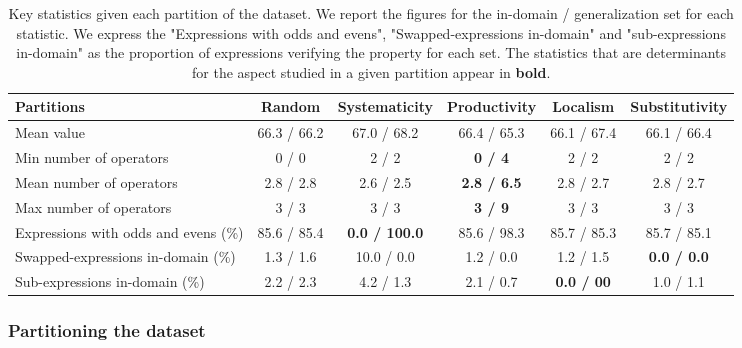 \begin{table}[t]
    \footnotesize
    \begin{tabularx}{16cm}{X|ccccc}
    \toprule
    \textbf{Partitions} & \textbf{Random} & \textbf{Systematicity} & \textbf{Productivity} & \textbf{Localism} & \textbf{Substitutivity} \\
    \midrule
    Mean value & 66.3 / 66.2 & 67.0 / 68.2 & 66.4 / 65.3 & 66.1 / 67.4 & 66.1 / 66.4 \\
    Min number of operators & 0 / 0 & 2 / 2 & \textbf{0 / 4} & 2 / 2 & 2 / 2 \\
    Mean number of operators & 2.8 / 2.8 & 2.6 / 2.5 & \textbf{2.8 / 6.5} & 2.8 / 2.7 & 2.8 / 2.7 \\
    Max number of operators & 3 / 3 & 3 / 3 & \textbf{3 / 9} & 3 / 3 & 3 / 3 \\
    \addlinespace
    Expressions with odds and evens (\%) & 85.6 / 85.4 & \textbf{0.0 / 100.0} & 85.6 / 98.3 & 85.7 / 85.3 & 85.7 / 85.1 \\
    Swapped-expressions in-domain (\%) & 1.3 / 1.6 & 10.0 / 0.0 & 1.2 / 0.0 & 1.2 / 1.5 & \textbf{0.0 / 0.0} \\
    Sub-expressions in-domain (\%) & 2.2 / 2.3 & 4.2 / 1.3 & 2.1 / 0.7 & \textbf{0.0 / 00} & 1.0 / 1.1 \\
    \bottomrule
    \end{tabularx}
    \caption{Key statistics given each partition of the dataset. We report the figures for the in-domain / generalization set for each statistic. We express the "Expressions with odds and evens", "Swapped-expressions in-domain" and "sub-expressions in-domain" as the proportion of expressions verifying the property for each set. The statistics that are determinants for the aspect studied in a given partition appear in \textbf{bold}.}
    \label{table:paritions}
\end{table}


\subsubsection{Partitioning the dataset}
\label{subsec:partition}


